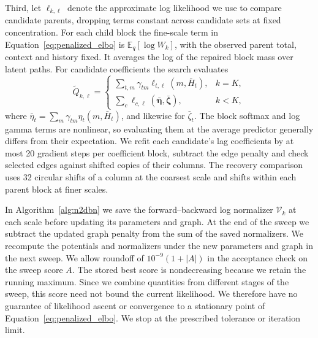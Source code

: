 \documentclass[sigconf]{acmart}
\begin{document}
Third, let \(\ell_{k,\ell}\) denote the approximate log likelihood we use to compare candidate parents, dropping terms constant across candidate sets at fixed concentration. For each child block the fine-scale term in Equation~\eqref{eq:penalized_elbo} is \(\mathbb E_q[\log W_k]\), with the observed parent total, context and history fixed. It averages the log of the repaired block mass over latent paths. For candidate coefficients the search evaluates
\begin{equation}
 \widetilde Q_{k,\ell}=
 \begin{cases}
 \sum_{t,m}\gamma_{tm}\ell_{t,\ell}(m,\bar H_t), & k=K,\\
 \sum_c\ell_{c,\ell}(\bar{\boldsymbol\eta},\bar{\boldsymbol\zeta}), & k<K,
 \end{cases}
 \label{eq:profiled_structure_score}
\end{equation}
where \(\bar\eta_t=\sum_m\gamma_{tm}\eta_t(m,\bar H_t)\), and likewise for \(\bar\zeta_t\). The block softmax and log gamma terms are nonlinear, so evaluating them at the average predictor generally differs from their expectation. We refit each candidate's lag coefficients by at most 20 gradient steps per coefficient block, subtract the edge penalty and check selected edges against shifted copies of their columns. The recovery comparison uses 32 circular shifts of a column at the coarsest scale and shifts within each parent block at finer scales.

In Algorithm~\ref{alg:n2dbn} we save the forward--backward log normalizer \(\mathcal V_k\) at each scale before updating its parameters and graph. At the end of the sweep we subtract the updated graph penalty from the sum of the saved normalizers. We recompute the potentials and normalizers under the new parameters and graph in the next sweep. We allow roundoff of \(10^{-9}(1+|A|)\) in the acceptance check on the sweep score \(A\). The stored best score is nondecreasing because we retain the running maximum. Since we combine quantities from different stages of the sweep, this score need not bound the current likelihood. We therefore have no guarantee of likelihood ascent or convergence to a stationary point of Equation~\eqref{eq:penalized_elbo}. We stop at the prescribed tolerance or iteration limit.
\end{document}
